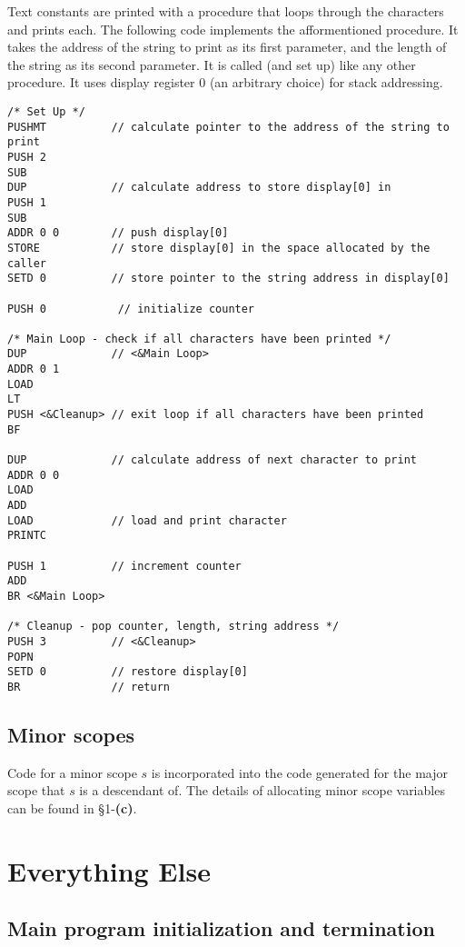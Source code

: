 \documentclass[11pt]{article}
\begin{document}
Text constants are printed with a procedure that loops through the characters and prints each. The following code implements the afformentioned procedure. It takes the address of the string to print as its first parameter, and the length of the string as its second parameter. It is called (and set up) like any other procedure. It uses display register 0 (an arbitrary choice) for stack addressing.

\begin{verbatim}
/* Set Up */
PUSHMT          // calculate pointer to the address of the string to print
PUSH 2
SUB
DUP             // calculate address to store display[0] in
PUSH 1
SUB
ADDR 0 0        // push display[0]
STORE           // store display[0] in the space allocated by the caller
SETD 0          // store pointer to the string address in display[0]

PUSH 0           // initialize counter

/* Main Loop - check if all characters have been printed */
DUP             // <&Main Loop>
ADDR 0 1
LOAD
LT
PUSH <&Cleanup> // exit loop if all characters have been printed
BF

DUP             // calculate address of next character to print
ADDR 0 0
LOAD
ADD
LOAD            // load and print character
PRINTC

PUSH 1          // increment counter
ADD
BR <&Main Loop>

/* Cleanup - pop counter, length, string address */
PUSH 3          // <&Cleanup>
POPN
SETD 0          // restore display[0]
BR              // return
\end{verbatim}

\subsection{Minor scopes}

Code for a minor scope $s$ is incorporated into the code generated for the major scope that $s$ is a descendant of. The details of allocating minor scope variables can be found in \S 1-\textbf{(c)}.

\section{Everything Else}

\subsection{Main program initialization and termination}
\end{document}
